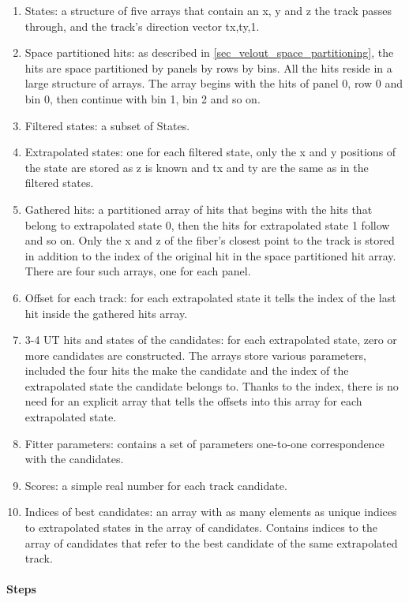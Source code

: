 \documentclass[12pt]{article}
\begin{document}
\begin{enumerate}
	\item States: a structure of five arrays that contain an x, y and z the track passes through, and the track's direction vector tx,ty,1.
	\item Space partitioned hits: as described in \ref{sec_velout_space_partitioning}, the hits are space partitioned by panels by rows by bins. All the hits reside in a large structure of arrays. The array begins with the hits of panel 0, row 0 and bin 0, then continue with bin 1, bin 2 and so on.
	\item Filtered states: a subset of States.
	\item Extrapolated states: one for each filtered state, only the x and y positions of the state are stored as z is known and tx and ty are the same as in the filtered states.
	\item Gathered hits: a partitioned array of hits that begins with the hits that belong to extrapolated state 0, then the hits for extrapolated state 1 follow and so on. Only the x and z of the fiber's closest point to the track is stored in addition to the index of the original hit in the space partitioned hit array. There are four such arrays, one for each panel.
	\item Offset for each track: for each extrapolated state it tells the index of the last hit inside the gathered hits array.
	\item 3-4 UT hits and states of the candidates: for each extrapolated state, zero or more candidates are constructed. The arrays store various parameters, included the four hits the make the candidate and the index of the extrapolated state the candidate belongs to. Thanks to the index, there is no need for an explicit array that tells the offsets into this array for each extrapolated state.
	\item Fitter parameters: contains a set of parameters one-to-one correspondence with the candidates.
	\item Scores: a simple real number for each track candidate.
	\item Indices of best candidates: an array with as many elements as unique indices to extrapolated states in the array of candidates. Contains indices to the array of candidates that refer to the best candidate of the same extrapolated track.
\end{enumerate}

\paragraph{Steps} \mbox{}\vspace{0.4pc}
\end{document}

